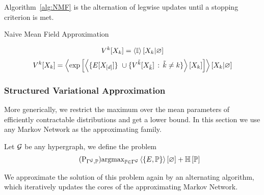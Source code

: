 Algorithm~\ref{alg:NMF} is the alternation of legwise updates until a stopping criterion is met.

\begin{algorithm}[h!]
\caption{Naive Mean Field Approximation}\label{alg:NMF}
\begin{algorithmic}
\For{$\catenumeratorin$}
	\State 
		\[ V^{k}[X_{k}] 
		= \left\langle \mathbb{I}\right\rangle \left[ X_{k} | \varnothing \right]  \]
\EndFor
{}
	\For{$\catenumeratorin$}
		\State 
			\[ \legcoreofat{\catenumerator}{\catvariableof{\catenumerator}} 
			= \normationof{ \expof{ \contractionof{ \{\energytensor[\shortcatvariables] \} \cup
				\{\legcoreofat{\seccatenumerator}{\catvariableof{\seccatenumerator}} \, : \, \seccatenumerator\neq\catenumerator\} }{\catvariableof{\catenumerator}} }
			}{\catvariableof{\catenumerator}} \]
\EndFor
\EndWhile
\end{algorithmic}
\end{algorithm}


\subsubsection{Structured Variational Approximation}

More generically, we restrict the maximum over the mean parameters of efficiently contractable distributions and get a lower bound.
In this section we use any Markov Network as the approximating family. 

Let $\mathcal{G}$ be any hypergraph, we define the problem
\begin{align}\tag{$\mathrm{P}_{\mnexpfamily, \probtensor}$}\label{prob:structuredApproximation}
	\argmax_{\probtensor\in \mnexpfamily} \sbcontraction{\energytensor,\probtensor} + \sentropyof{\probtensor}
\end{align}

We approximate the solution of this problem again by an alternating algorithm, which iteratively updates the cores of the approximating Markov Network. 


